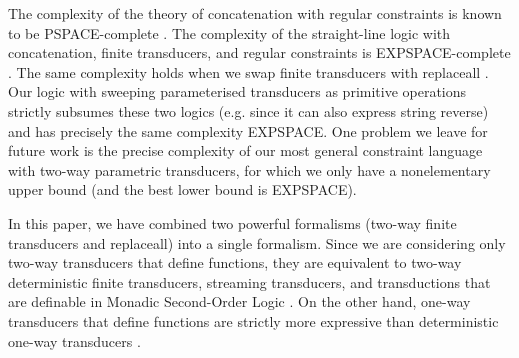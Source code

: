 The complexity of the theory of concatenation with regular constraints is
known to be PSPACE-complete \cite{Plandowski,J17}.
The complexity of the straight-line logic with concatenation, finite
transducers, and regular constraints is EXPSPACE-complete \cite{LB16}. The same 
complexity holds when we swap finite transducers with replaceall 
\cite{CCHLW18}. Our logic with sweeping parameterised transducers
as primitive operations strictly subsumes these two logics (e.g. since it can
also express string reverse) and has precisely the same complexity EXPSPACE.
One problem we leave for future work is the precise 
complexity of our most general constraint language with two-way parametric 
transducers, for which we only have a nonelementary upper bound (and the best
lower bound is EXPSPACE).

In this paper, we have combined two powerful formalisms 
(two-way finite transducers and replaceall) into a single formalism. Since we 
are considering
only two-way transducers that define functions, they are equivalent to 
two-way deterministic finite transducers, streaming transducers, and
transductions that are definable in Monadic Second-Order Logic
\cite{EH01,AC10,AD11}. On the other hand, one-way transducers that define 
functions are strictly more expressive than deterministic one-way transducers
\cite{Berstel}. 


